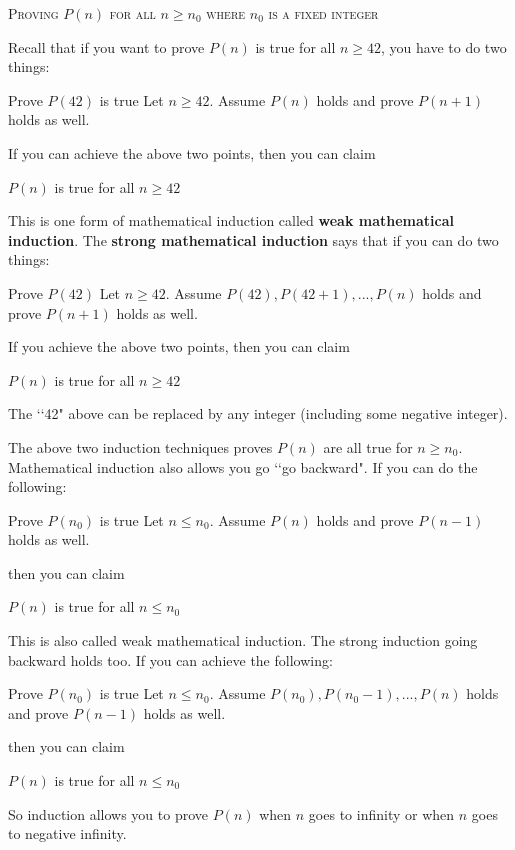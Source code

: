 \textsc{Proving $P(n)$ for all $n \geq n_0$ where $n_0$ is a fixed integer}

Recall that if you want to prove
$P(n)$ is true for all $n \geq 42$,
you have to do two things:
\begin{tightlist}
  \li Prove $P(42)$ is true
  \li Let $n \geq 42$. Assume $P(n)$ holds and prove $P(n + 1)$ holds as well.
\end{tightlist}
If you can achieve the above two points, then you can claim
\begin{tightlist}
  \li $P(n)$ is true for all $n \geq 42$
\end{tightlist}
This is one form of mathematical induction called \textbf{weak mathematical induction}.
The \textbf{strong mathematical induction} says that if you can do two things:
\begin{tightlist}
  \li Prove $P(42)$
  \li Let $n \geq 42$. Assume $P(42), P(42 + 1), ..., P(n)$ holds and prove $P(n + 1)$ holds as well.
\end{tightlist}
If you achieve the above two points, then you can claim
\begin{tightlist}
  \li $P(n)$ is true for all $n \geq 42$
\end{tightlist}
The \lq\lq42" above can be replaced by any integer (including some negative integer).

The above two induction techniques proves $P(n)$ are all true for $n \geq n_0$.
Mathematical induction also allows you go \lq\lq go backward".
If you can do the following:
\begin{tightlist}
  \li Prove $P(n_0)$ is true
  \li Let $n \leq n_0$. Assume $P(n)$ holds and prove $P(n - 1)$ holds as well.
\end{tightlist}
then you can claim
\begin{tightlist}
  \li $P(n)$ is true for all $n \leq n_0$
\end{tightlist}
This is also called weak mathematical induction.
The strong induction going backward holds too.
If you can achieve the following:
\begin{tightlist}
  \li Prove $P(n_0)$ is true
  \li Let $n \leq n_0$. Assume $P(n_0), P(n_0 - 1), ..., P(n)$  holds and prove $P(n - 1)$ holds as well.
\end{tightlist}
then you can claim
\begin{tightlist}
  \li $P(n)$ is true for all $n \leq n_0$
\end{tightlist}
So induction allows you to prove $P(n)$ when $n$ goes to infinity or
when $n$ goes to negative infinity.

